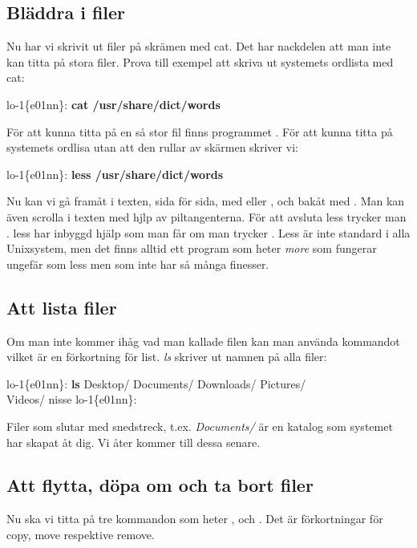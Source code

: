 \documentclass[a4paper,twocolumn]{book}
\begin{document}
\subsection{Bläddra i filer}

Nu har vi skrivit ut filer på skrämen med cat. Det har nackdelen att man
inte kan titta på stora filer. Prova till exempel att skriva ut systemets
ordlista med cat:

\begin{example}
lo-1\{e01nn\}: \textbf{cat /usr/share/dict/words}
\end{example}

För att kunna titta på en så stor fil finns programmet . För att
kunna titta på systemets ordlisa utan att den rullar av skärmen skriver vi:

\begin{example}
lo-1\{e01nn\}: \textbf{less /usr/share/dict/words}
\end{example}

Nu kan vi gå framåt i texten, sida för sida, med  eller
, och bakåt med . Man kan även scrolla i texten med hjlp av piltangenterna. För att avsluta less trycker man .
less har inbyggd hjälp som man får om man trycker .
Less är inte standard i alla Unixsystem, men det finns alltid ett
program som heter \emph{more} som fungerar ungefär som less men som
inte har så många finesser.

\subsection{Att lista filer}

Om man inte kommer ihåg vad man kallade filen kan man använda
kommandot  vilket är en förkortning för list. \emph{ls}
skriver ut namnen på alla filer:
\begin{example}
lo-1\{e01nn\}: \textbf{ls}
Desktop/ Documents/ Downloads/ Pictures/\\Videos/   nisse
lo-1\{e01nn\}: 
\end{example}
Filer som slutar med snedstreck, t.ex. \emph{Documents/} är en katalog som systemet har skapat åt
dig. Vi åter kommer till dessa senare.

\subsection{Att flytta, döpa om och ta bort filer}

Nu ska vi titta på tre kommandon som heter , 
och . Det är förkortningar för copy, move respektive
remove.
\end{document}
